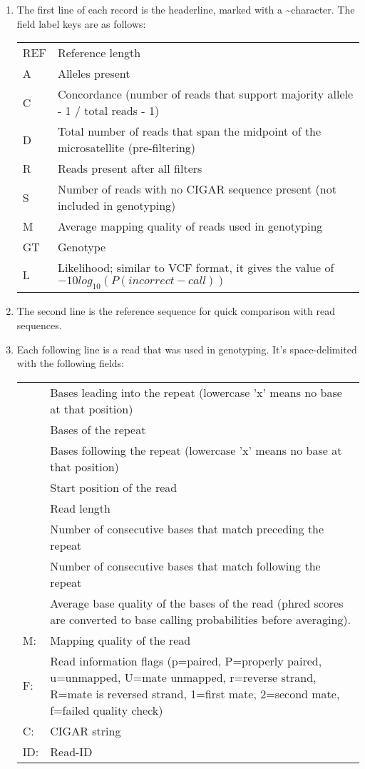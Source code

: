 \documentclass[11pt]{article}
\begin{document}
\begin{enumerate}
\item The first line of each record is the headerline, marked with a \textasciitilde character. The field label keys are as follows:
\begin{center}
\begin{tabular}{lp{5.5in}}
REF&Reference length\\
A&Alleles present\\
C&Concordance (number of reads that support majority allele - 1 / total reads - 1)\\
D&Total number of reads that span the midpoint of the microsatellite (pre-filtering)\\
R&Reads present after all filters\\
S&Number of reads with no CIGAR sequence present (not included in genotyping)\\
M&Average mapping quality of reads used in genotyping\\
GT&Genotype\\
L&Likelihood; similar to VCF format, it gives the value of $-10log_{10}( P(incorrect-call))$\\
\end {tabular}
\end{center}

\item The second line is the reference sequence for quick comparison with read sequences.

\item Each following line is a read that was used in genotyping. It’s space-delimited with the following fields:
\begin{center}
\begin{tabular}{lp{5.5in}}
&Bases leading into the repeat (lowercase 'x' means no base at that position)\\
&Bases of the repeat \\
&Bases following the repeat (lowercase 'x' means no base at that position)\\
&Start position of the read\\
&Read length\\
&Number of consecutive bases that match preceding the repeat\\
&Number of consecutive bases that match following the repeat\\
&Average base quality of the bases of the read (phred scores are converted to base calling probabilities before averaging).\\
M:&Mapping quality of the read\\
F:&Read information flags (p=paired, P=properly paired, u=unmapped, U=mate unmapped, r=reverse strand, R=mate is reversed strand, 1=first mate, 2=second mate, f=failed quality check)\\
C:&CIGAR string\\
ID:&Read-ID\\
\end{tabular}
\end{center}
\end {enumerate}
\end{document}
